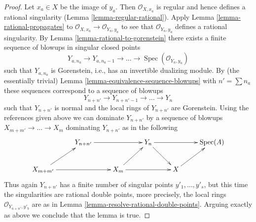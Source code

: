 \documentclass[10pt,a4paper]{amsart}
\theoremstyle{plain}
\theoremstyle{definition}
\theoremstyle{remark}
\numberwithin{equation}{subsection}
\def\Spec{\mathop{\mathrm{Spec}}}
\begin{document}
\begin{proof}
\medskip\noindent
Let $x_a \in X$ be the image of $y_a$. Then $\mathcal{O}_{X, x_a}$
is regular and hence defines a rational singularity
(Lemma \ref{lemma-regular-rational}).
Apply Lemma \ref{lemma-rational-propagates} to
$\mathcal{O}_{X, x_a} \to \mathcal{O}_{Y_n, y_a}$
to see that $\mathcal{O}_{Y_n, y_a}$ defines a
rational singularity. By Lemma \ref{lemma-rational-to-gorenstein}
there exists a finite sequence of blowups in singular closed points
$$
Y_{a, n_a} \to Y_{a, n_a - 1} \to \ldots \to \Spec(\mathcal{O}_{Y_n, y_a})
$$
such that $Y_{a, n_a}$ is Gorenstein, i.e., has an
invertible dualizing module. By (the essentially trivial)
Lemma \ref{lemma-equivalence-sequence-blowups}
with $n' = \sum n_a$ these sequences correspond to a sequence of
blowups
$$
Y_{n + n'} \to Y_{n + n' - 1} \to \ldots \to Y_n
$$
such that $Y_{n + n'}$ is normal and
the local rings of $Y_{n + n'}$ are Gorenstein. Using the references
given above we can dominate $Y_{n + n'}$ by a sequence of blowups
$X_{m + m'} \to \ldots \to X_m$ dominating $Y_{n + n'}$ as in the following
$$
\xymatrix{
 & Y_{n + n'} \ar[rr] & & Y_n \ar[rd] \ar[rr] & & \Spec(A) \\
X_{m + m'} \ar[ru] \ar[rr] & & X_m \ar[rr] \ar[ru] & & X \ar[ru]
}
$$
Thus again $Y_{n + n'}$ has a finite number of singular points
$y'_1, \ldots, y'_s$, but this time the singularities are
rational double points, more precisely, the local rings
$\mathcal{O}_{Y_{n + n'}, y'_b}$ are as in
Lemma \ref{lemma-resolve-rational-double-points}.
Arguing exactly as above we conclude that the lemma is true.
\end{proof}
\end{document}
